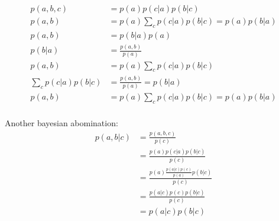 \begin{align*}
    p(a, b, c) & = p(a)p(c|a)p(b|c) \\
    p(a, b) & = p(a)\sum_c p(c|a)p(b|c) = p(a)p(b|a) \\     
    p(a,b) & = p(b|a)p(a) \\
    p(b|a) & = \frac{p(a,b)}{p(a)} \\
    p(a, b) & = p(a)\sum_c p(c|a)p(b|c) \\
    \sum_c p(c|a)p(b|c) & = \frac{p(a,b)}{p(a)}  = p(b|a) \\
    p(a, b) & = p(a)\sum_c p(c|a)p(b|c) = p(a)p(b|a) \\ 
\end{align*}

Another bayesian abomination: \\

\begin{align*}
p(a,b|c) & = \frac{p(a,b,c)}{p(c)} \\
 & = \frac{p(a)p(c|a)p(b|c)}{p(c)}\\
 & = \frac{p(a)\frac{p(a|c)p(c)}{p(a)}p(b|c)}{p(c)}\\
 & = \frac{p(a|c)p(c)p(b|c)}{p(c)}\\ 
 & = p(a|c)p(b|c)\\  
\end{align*}


